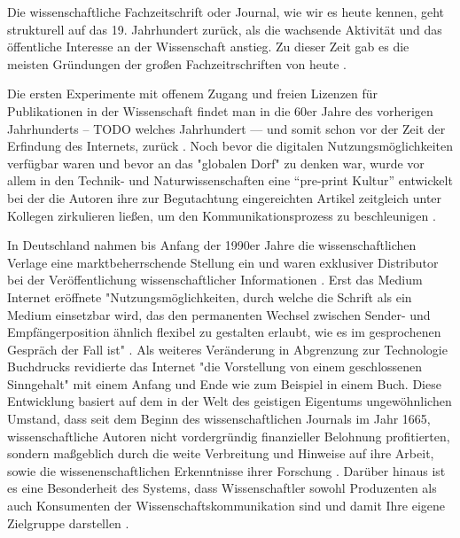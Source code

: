 Die wissenschaftliche Fachzeitschrift oder Journal, wie wir es heute kennen, geht strukturell auf das 19. Jahrhundert zurück, als die wachsende Aktivität und das öffentliche Interesse an der Wissenschaft anstieg. Zu dieser Zeit gab es die meisten Gründungen der großen Fachzeitrschriften von heute \cite{porter_1964_scientific}.

Die ersten Experimente mit offenem Zugang und freien Lizenzen für Publikationen in der Wissenschaft findet man in die 60er Jahre des vorherigen Jahrhunderts  -- TODO welches Jahrhundert --- und somit schon vor der Zeit der Erfindung des Internets, zurück \cite{cite:18b}. Noch bevor die digitalen Nutzungsmöglichkeiten verfügbar waren und bevor an das "globalen Dorf"\cite{mcluhan_1962_gutenberg} zu denken war, wurde vor allem in den Technik- und Naturwissenschaften eine “pre-print Kultur” entwickelt bei der die Autoren ihre zur Begutachtung eingereichten Artikel zeitgleich unter Kollegen zirkulieren ließen, um den Kommunikationsprozess zu beschleunigen \cite{suchen-Hoffmann-Zugang-undVerwertung-öffentlicher-Informationen}. 

In Deutschland nahmen bis Anfang der 1990er Jahre die wissenschaftlichen Verlage eine marktbeherrschende Stellung ein und waren exklusiver Distributor bei der Veröffentlichung wissenschaftlicher Informationen \cite{schloegl_2005} \cite{offhaus_2012_institutionelle_repos}. Erst das Medium Internet eröffnete "Nutzungsmöglichkeiten, durch welche die Schrift als ein Medium einsetzbar wird, das den permanenten Wechsel zwischen Sender- und Empfängerposition ähnlich flexibel zu gestalten erlaubt, wie es im gesprochenen Gespräch der Fall ist" \cite{sandbothe_2000_pragmatische}. Als weiteres Veränderung in Abgrenzung zur Technologie Buchdrucks revidierte das Internet "die Vorstellung von einem geschlossenen Sinngehalt" \cite{sandbothe_2000_pragmatische} mit einem Anfang und Ende wie zum Beispiel in einem Buch. Diese Entwicklung basiert auf dem in der Welt des geistigen Eigentums ungewöhnlichen Umstand, dass seit dem Beginn des wissenschaftlichen Journals im Jahr 1665, wissenschaftliche Autoren nicht vordergründig finanzieller Belohnung profitierten, sondern maßgeblich durch die weite Verbreitung und Hinweise auf ihre Arbeit, sowie die wissenenschaftlichen Erkenntnisse ihrer Forschung \cite{albert_2006_open_implications}. Darüber hinaus ist es eine Besonderheit des Systems, dass Wissenschaftler sowohl Produzenten als auch Konsumenten der Wissenschaftskommunikation sind und damit Ihre eigene Zielgruppe darstellen \cite{Hess_2006}.

